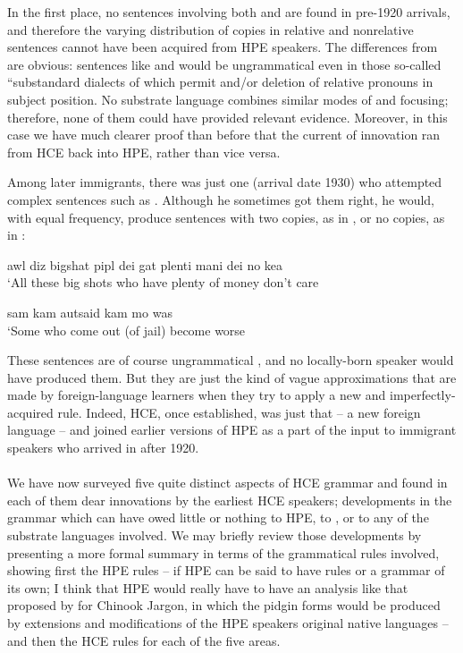 In the first place, no sentences involving both  and  are found in pre-1920 arrivals, and therefore the varying distribution of copies in relative and nonrelative sentences cannot have been acquired from HPE speakers. The differences from  are obvious: sentences like   and   would be ungramma\-tical even in those so-called ``substandard dialects of  which permit  and/or deletion of relative pronouns in subject position. No substrate language combines similar modes of  and focusing; therefore, none of them could have pro\-vided relevant evidence. Moreover, in this case we have much clearer proof than before that the current of innovation ran from HCE back into HPE, rather than vice versa.

Among later immigrants, there was just one (arrival date 1930) who attempted complex sentences such as . Although he some\-times got them right, he would, with equal frequency, produce sen\-tences with two copies, as in , or no copies, as in :

\ea\label{ex:84}
awl diz bigshat pipl dei gat plenti mani dei no kea\\
\glt `All these big shots who have plenty of money don't care 
\z

\ea\label{ex:85} 
sam kam autsaid kam mo was\\
\glt `Some who come out (of jail) become worse
\z

\noindent These sentences are of course ungrammatical , and no locally-born speaker would have produced them. But they are just the kind of vague approximations that are made by foreign-language learners when they try to apply a new and imperfectly-acquired rule. Indeed, HCE, once established, was just that -- a new foreign language -- and joined earlier versions of HPE as a part of the input to immigrant speakers who arrived in  after 1920.\\\\


We have now surveyed five quite distinct aspects of HCE gram\-mar and found in each of them dear innovations by the earliest HCE
speakers; developments in the grammar which can have owed little or nothing to HPE, to , or to any of the substrate languages involved. We may briefly review those developments by presenting a more formal summary in terms of the grammatical rules involved, showing first the HPE rules -- if HPE can be said to have rules or a grammar of its own; I think that HPE would really have to have an analysis like that proposed by \citet{Silverstein1972} for Chinook Jargon, in which the pidgin forms would be produced by extensions and modifications of the HPE speakers original native languages -- and then the HCE rules for each of the five areas.

